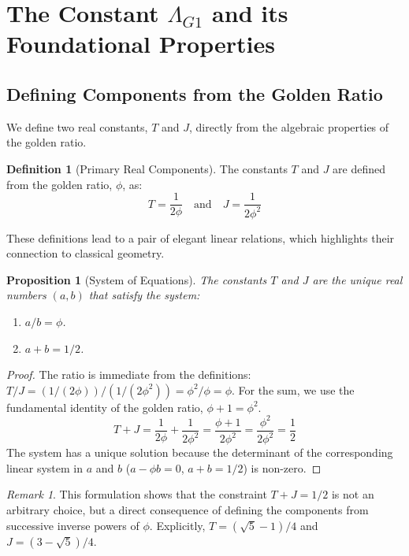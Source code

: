 \documentclass{amsart}
\theoremstyle{plain}
\newtheorem{proposition}[theorem]{Proposition}
\theoremstyle{definition}
\newtheorem{definition}[theorem]{Definition}
\theoremstyle{remark}
\newtheorem*{remark}{Remark}
\begin{document}
\section{The Constant \texorpdfstring{$\Lambda_{G1}$}{Lambda\_G1} and its Foundational Properties}

\subsection{Defining Components from the Golden Ratio}
We define two real constants, $T$ and $J$, directly from the algebraic properties of the golden ratio.

\begin{definition}[Primary Real Components]
The constants $T$ and $J$ are defined from the golden ratio, $\phi$, as:
$$ T = \frac{1}{2\phi} \quad \text{and} \quad J = \frac{1}{2\phi^2} $$
\end{definition}

These definitions lead to a pair of elegant linear relations, which highlights their connection to classical geometry.

\begin{proposition}[System of Equations]
The constants $T$ and $J$ are the unique real numbers $(a,b)$ that satisfy the system:
\begin{enumerate}
    \item $a/b = \phi$.
    \item $a+b = 1/2$.
\end{enumerate}
\end{proposition}
\begin{proof}
The ratio is immediate from the definitions: $T/J = (1/(2\phi))/(1/(2\phi^2)) = \phi^2/\phi = \phi$.
For the sum, we use the fundamental identity of the golden ratio, $\phi+1 = \phi^2$.
$$ T+J = \frac{1}{2\phi} + \frac{1}{2\phi^2} = \frac{\phi+1}{2\phi^2} = \frac{\phi^2}{2\phi^2} = \frac{1}{2} $$
The system has a unique solution because the determinant of the corresponding linear system in $a$ and $b$ ($a - \phi b = 0$, $a+b=1/2$) is non-zero.
\end{proof}

\begin{remark}
This formulation shows that the constraint $T+J=1/2$ is not an arbitrary choice, but a direct consequence of defining the components from successive inverse powers of $\phi$. Explicitly, $T = (\sqrt{5}-1)/4$ and $J = (3-\sqrt{5})/4$.
\end{remark}
\end{document}
